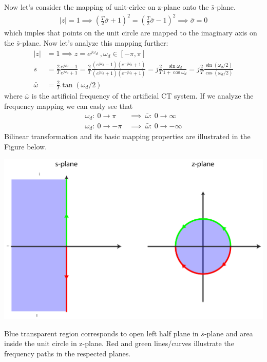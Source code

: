 \documentclass[twoside]{article}
\begin{document}
Now let's consider the mapping of unit-cirlce on z-plane onto the 
$\bar{s}$-plane. 
%
\begin{align*}
  | z | = 1 \implies \left( \frac{T}{2} \bar{\sigma} + 1 \right)^2 
=
\left( \frac{T}{2} \bar{\sigma} - 1 \right)^2 \implies \bar{\sigma} = 0
\end{align*}
%
which imples that points on the unit circle are mapped to the
imaginary axis on the $\bar{s}$-plane. Now let's analyze this 
mapping further:
\begin{align*}
  | z | &= 1 \implies z = e^{j \omega_d} \ , \omega_d \in [-\pi , \pi]
\\
\bar{s} &= \frac{2}{T} \frac{e^{j \omega_d}-1}{e^{j \omega_d}+1} =   
\frac{2}{T} \frac{(e^{j \omega_d}-1)(e^{-j \omega_d}+1)}{(e^{j \omega_d}+1)(e^{-j \omega_d}+1)} =
j \frac{2}{T} \frac{ \sin \omega_d}{1 + \cos \omega_d}
= j \frac{2}{T} \frac{\sin (\omega_d/2) }{\cos (\omega_d/2)}
\\
\bar{\omega} &= \frac{2}{T} \tan (\omega_d/2)
\end{align*}
%
where $\bar{\omega}$ is the artificial frequency of the artificial CT system. 
If we analyze the frequency mapping we can easly see that
%
\begin{align*}
  \omega_d: \ 0 \to \pi \ &\implies \ \bar{\omega}: \ 0 \to \infty
\\
\omega_d: \ 0 \to -\pi \ &\implies \ \bar{\omega}: \ 0 \to -\infty
\end{align*}
%
Bilinear transformation and its basic mapping properties
are illustrated in the Figure below. 
%
    \begin{center}
\begin{minipage}[h]{0.8\linewidth}
    \begin{center}
      \includegraphics[width=\textwidth]{bilinear}
    \end{center}
\end{minipage}
    \end{center}
%
Blue transparent region corresponds to open left half
plane in $\bar{s}$-plane and area inside the unit 
circle in z-plane. Red and green lines/curves
illustrate the frequency paths in the respected
planes. 
\end{document}

